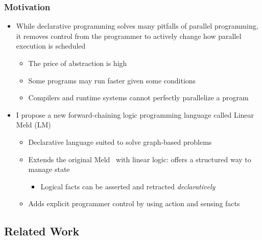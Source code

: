 \documentclass{beamer}
\begin{document}
\begin{frame}[fragile]
   \frametitle{Motivation}
   \begin{itemize}
      \item While declarative programming solves many pitfalls of parallel programming, it removes control from the programmer to actively change how parallel execution is scheduled
      \begin{itemize}
         \item The price of abstraction is high
         \item Some programs may run faster given some conditions
         \item Compilers and runtime systems cannot perfectly parallelize a program
      \end{itemize}
      \item I propose a new forward-chaining logic programming language called Linear Meld (LM)
      \begin{itemize}
         \item Declarative language suited to solve graph-based problems
         \item Extends the original Meld~\cite{ashley-rollman-iclp09} with linear logic: offers a structured way to manage state
         \begin{itemize}
            \item Logical facts can be asserted and retracted \emph{declaratively}
         \end{itemize}
         \item Adds explicit programmer control by using action and sensing facts
      \end{itemize}
   \end{itemize}
\end{frame}

\subsection{Related Work}
\end{document}
